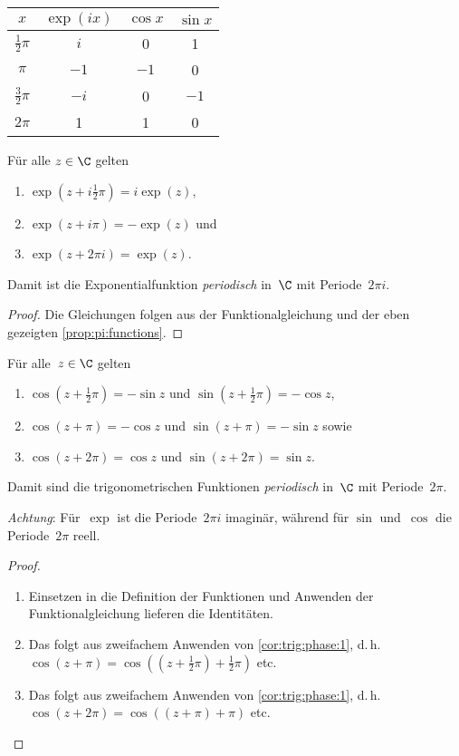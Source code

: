 \documentclass[a4paper]{article}
\begin{document}
\begin{center}
    \begin{tabular}{@{}c@{\colsep}ccc@{}}\toprule
        $x$ & $\exp(ix)$ & $\cos x$ & $\sin x$ \\\midrule
        $\frac{1}{2}\pi$ & $i$ & 0 & 1 \\
        $\pi$ & $-1$ & $-1$ & 0 \\
        $\frac{3}{2}\pi$ & $-i$ & 0 & $-1$ \\
        $2\pi$ & 1 & 1 & 0 \\\bottomrule
    \end{tabular}
\end{center}

\begin{theorem}
    Für alle $z \in \C$ gelten
    \begin{enumerate}
        \item $\exp(z+i\frac{1}{2}\pi) = i\exp(z)$,
        \item $\exp(z+i\pi) = -\exp(z)$ und
        \item $\exp(z+2\pi i) = \exp(z)$.
    \end{enumerate}
    Damit ist die Exponentialfunktion \emph{periodisch} in~$\C$ mit Periode~$2\pi i$.
\end{theorem}

\begin{proof}
    Die Gleichungen folgen aus der Funktionalgleichung und der eben gezeigten \cref{prop:pi:functions}.
\end{proof}

\begin{corollary}[Phasenverschiebung]
    Für alle~$z \in \C$ gelten
    \begin{enumerate}
        \item $\cos(z+\frac{1}{2}\pi) = -\sin z$ und $\sin(z+\frac{1}{2}\pi) = -\cos z$,\label{cor:trig:phase:1}
        \item $\cos(z+\pi) = -\cos z$ und $\sin(z+\pi) = -\sin z$ sowie\label{cor:trig:phase:2}
        \item $\cos(z+2\pi) = \cos z$ und $\sin(z+2\pi) = \sin z$.
    \end{enumerate}
    Damit sind die trigonometrischen Funktionen \emph{periodisch} in~$\C$ mit Periode~$2\pi$.
\end{corollary}

\emph{Achtung}: Für~$\exp$ ist die Periode~$2\pi i$ imaginär, während für $\sin$ und~$\cos$ die Periode~$2\pi$ reell.

\begin{proof}\leavevmode
    \begin{enumerate}
        \item Einsetzen in die Definition der Funktionen und Anwenden der Funktionalgleichung lieferen die Identitäten.
        \item Das folgt aus zweifachem Anwenden von \cref{cor:trig:phase:1}, d.\,h.\ $\cos(z+\pi) = \cos((z+\frac{1}{2}\pi) + \frac{1}{2}\pi)$ etc.
        \item Das folgt aus zweifachem Anwenden von \cref{cor:trig:phase:1}, d.\,h.\ $\cos(z+2\pi) = \cos((z+\pi) +\pi)$ etc.
    \end{enumerate}
\end{proof}
\end{document}
